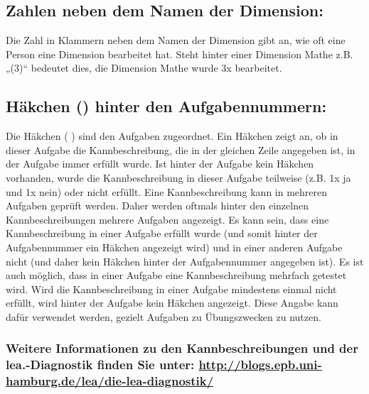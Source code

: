 \documentclass{article}
\newcommand\cm{%
\checkmark
}
\begin{document}
{

\subsection*{Zahlen neben dem Namen der Dimension:}
Die Zahl in Klammern neben dem Namen der Dimension gibt an, wie oft eine Person eine Dimension bearbeitet hat. Steht hinter einer Dimension Mathe z.B. „(3)“ bedeutet dies, die Dimension Mathe wurde 3x bearbeitet.
\subsection*{Häkchen (\checkmark) hinter den Aufgabennummern:}
Die Häkchen (\cm) sind den Aufgaben zugeordnet. Ein Häkchen zeigt an, ob in dieser Aufgabe die Kannbeschreibung, die in der gleichen Zeile angegeben ist, in der Aufgabe immer erfüllt wurde. Ist hinter der Aufgabe kein Häkchen vorhanden, wurde die Kannbeschreibung in dieser Aufgabe teilweise (z.B. 1x ja und 1x nein) oder nicht erfüllt. Eine Kannbeschreibung kann in mehreren Aufgaben geprüft werden. Daher werden oftmals hinter den einzelnen Kannbeschreibungen mehrere Aufgaben angezeigt. Es kann sein, dass eine Kannbeschreibung in einer Aufgabe erfüllt wurde (und somit hinter der Aufgabennummer ein Häkchen angezeigt wird) und in einer anderen Aufgabe nicht (und daher kein Häkchen hinter der Aufgabennummer angegeben ist). Es ist auch möglich, dass in einer Aufgabe eine Kannbeschreibung mehrfach getestet wird. Wird die Kannbeschreibung in einer Aufgabe mindestens einmal nicht erfüllt, wird hinter der Aufgabe kein Häkchen angezeigt. Diese Angabe kann dafür verwendet werden, gezielt Aufgaben zu Übungszwecken zu nutzen.

\subsubsection*{Weitere Informationen zu den Kannbeschreibungen und der lea.-Diagnostik finden Sie unter: \underline{http://blogs.epb.uni-hamburg.de/lea/die-lea-diagnostik/}}}
\newpage
\restoregeometry


\pagecolor{bg}

\newpage

\newpage

\end{document}
